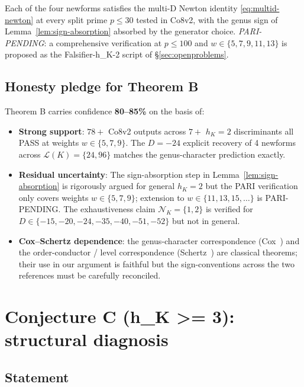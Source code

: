 \documentclass[11pt,a4paper]{amsart}
\theoremstyle{definition}
\newcommand{\Lcal}{\mathcal{L}}
\newcommand{\Ncal}{\mathcal{N}}
\newcommand{\hK}{h_{K}}
\begin{document}
Each of the four newforms satisfies the multi-D Newton identity \eqref{eq:multid-newton} at every split prime $p \le 30$ tested in Co8v2, with the genus sign of Lemma~\ref{lem:sign-absorption} absorbed by the generator choice. \emph{PARI-PENDING}: a comprehensive verification at $p \le 100$ and $w \in \{5, 7, 9, 11, 13\}$ is proposed as the Falsifier-h\_K-2 script of \S\ref{sec:openproblems}.

\subsection{Honesty pledge for Theorem B}\label{sec:thmB-honesty}

Theorem B carries confidence \textbf{80--85\%} on the basis of:
\begin{itemize}[leftmargin=2em]
  \item \textbf{Strong support}: $78+$ Co8v2 outputs across $7+$ $\hK = 2$ discriminants all PASS at weights $w \in \{5, 7, 9\}$. The $D = -24$ explicit recovery of 4 newforms across $\Lcal(K) = \{24, 96\}$ matches the genus-character prediction exactly.
  \item \textbf{Residual uncertainty}: The sign-absorption step in Lemma~\ref{lem:sign-absorption} is rigorously argued for general $\hK = 2$ but the PARI verification only covers weights $w \in \{5, 7, 9\}$; extension to $w \in \{11, 13, 15, \ldots\}$ is PARI-PENDING. The exhaustiveness claim $\Ncal_K = \{1, 2\}$ is verified for $D \in \{-15, -20, -24, -35, -40, -51, -52\}$ but not in general.
  \item \textbf{Cox--Schertz dependence}: the genus-character correspondence (Cox~\cite[Thm.~3.15]{Cox2013}) and the order-conductor / level correspondence (Schertz~\cite[\S6.3]{Schertz2010}) are classical theorems; their use in our argument is faithful but the sign-conventions across the two references must be carefully reconciled.
\end{itemize}


\section{Conjecture C (h\_K >= 3): structural diagnosis}\label{sec:conjC}

\subsection{Statement}\label{sec:conjC-statement}
\end{document}
